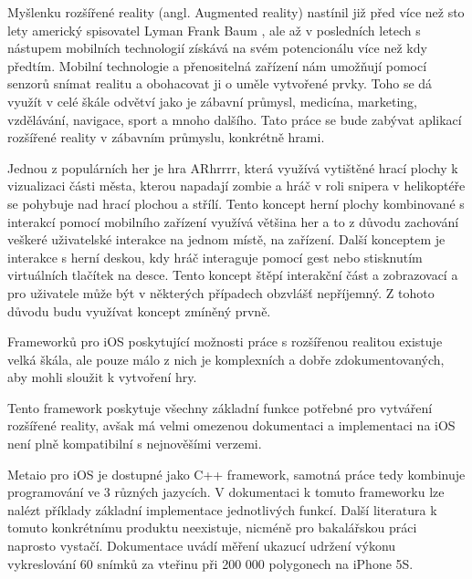 \documentclass[oneside,12pt]{article}
\begin{document}
\def\,{\penalty10000\hskip.25em}
\pagestyle{headings}
\bakalarska
{}

\obsah

\newpage
%
%
% 
Myšlenku rozšířené reality (angl. Augmented reality) nastínil již před více než sto lety americký spisovatel Lyman Frank Baum \cite{baum}, ale až v posledních letech s nástupem mobilních technologií získává na svém potencionálu více než kdy předtím. Mobilní technologie a přenositelná zařízení nám umožňují pomocí senzorů snímat realitu a obohacovat ji o uměle vytvořené prvky. Toho se dá využít v celé škále odvětví jako je zábavní průmysl, medicína, marketing, vzdělávání, navigace, sport a mnoho dalšího. Tato práce se bude zabývat aplikací rozšířené reality v zábavním průmyslu, konkrétně hrami. 

Jednou z populárních her je hra ARhrrrr, která využívá vytištěné hrací plochy k vizualizaci části města, kterou napadají zombie a hráč v roli snipera v helikoptéře se pohybuje nad hrací plochou a střílí. Tento koncept herní plochy kombinované s interakcí pomocí mobilního zařízení využívá většina her a to z důvodu zachování veškeré uživatelské interakce na jednom místě, na zařízení. Další konceptem je interakce s herní deskou, kdy hráč interaguje pomocí gest nebo stisknutím virtuálních tlačítek na desce. Tento koncept štěpí interakční část a zobrazovací a pro uživatele může být v některých případech obzvlášť nepříjemný. Z tohoto důvodu budu využívat koncept zmíněný prvně.

Frameworků pro iOS poskytující možnosti práce s rozšířenou realitou existuje velká škála, ale pouze málo z nich je komplexních a dobře zdokumentovaných, aby mohli sloužit k vytvoření hry. 

Tento framework poskytuje všechny základní funkce potřebné pro vytváření rozšířené reality, avšak má velmi omezenou dokumentaci a implementaci na iOS není plně kompatibilní s nejnověšími verzemi.

Metaio pro iOS je dostupné jako C++ framework, samotná práce tedy kombinuje programování ve 3 různých jazycích. V dokumentaci k tomuto frameworku lze nalézt příklady základní implementace jednotlivých funkcí. Další literatura k tomuto konkrétnímu produktu neexistuje, nicméně pro bakalářskou práci naprosto vystačí. Dokumentace uvádí měření ukazucí udržení výkonu vykreslování 60 snímků za vteřinu při 200 000 polygonech na iPhone 5S.
\end{document}

